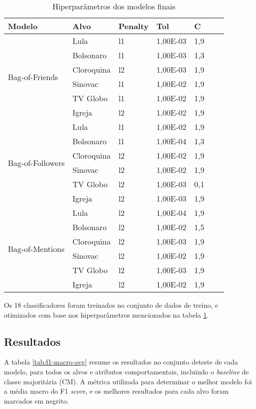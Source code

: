 \documentclass[
	12pt, oneside, a4paper, english, brazil
]{abntex2ppgsi}
\begin{document}
\begin{table}[ht]
\centering
\caption{Hiperparâmetros dos modelos finais}
\label{tab:hiperparametros-modelos-finais}
\begin{tabular}{ llllllc }
\hline
Modelo & Alvo & Penalty & Tol & C \\
\hline
\multirow{6}{*}{Bag-of-Friends} & Lula & l1 & 1,00E-03 & 1,9 \\
& Bolsonaro & l1 & 1,00E-03 & 1,3 \\
& Cloroquina & l2 & 1,00E-03 & 1,9 \\
& Sinovac & l1 & 1,00E-02 & 1,9 \\
& TV Globo & l1 & 1,00E-02 & 1,9 \\
& Igreja & l2 & 1,00E-02 & 1,9 \\
\hline
\multirow{6}{*}{Bag-of-Followers} & Lula & l1 & 1,00E-02 & 1,9 \\
& Bolsonaro & l1 & 1,00E-04 & 1,3 \\
& Cloroquina & l2 & 1,00E-02 & 1,9 \\
& Sinovac & l2 & 1,00E-02 & 1,9 \\
& TV Globo & l2 & 1,00E-03 & 0,1 \\
& Igreja & l2 & 1,00E-03 & 1,9 \\
\hline
\multirow{6}{*}{Bag-of-Mentions} & Lula & l2 & 1,00E-04 & 1,9 \\
& Bolsonaro & l2 & 1,00E-02 & 1,5 \\
& Cloroquina & l2 & 1,00E-03 & 1,9 \\
& Sinovac & l2 & 1,00E-02 & 1,9 \\
& TV Globo & l2 & 1,00E-03 & 1,9 \\
& Igreja & l2 & 1,00E-02 & 1,9 \\
\hline
\end{tabular}
\end{table}

Os 18 classificadores foram treinados no conjunto de dados de treino, e otimizados com base nos hiperparâmetros mencionados na tabela \ref{tab:hiperparametros-modelos-finais}.

\subsection{Resultados}
A tabela \ref{tab:f1-macro-avg} resume os resultados no conjunto deteste de cada modelo, para todos os alvos e atributos comportamentais, incluindo o {\em baseline} de classe majoritária (CM). A métrica utilizada para determinar o melhor modelo foi a média macro do F1 {\em score}, e os melhores resultados para cada alvo foram marcados em negrito.
\end{document}
